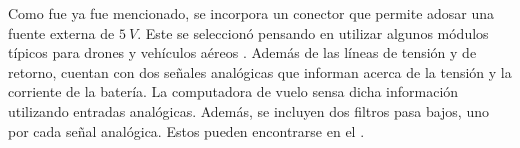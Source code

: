 



Como fue ya fue mencionado, se incorpora un conector que permite adosar una fuente externa de $5 \ V$. Este se seleccionó pensando en utilizar algunos módulos típicos para drones y vehículos aéreos \cite{HolybroPM02PowerModule}. Además de las líneas de tensión y de retorno, cuentan con dos señales analógicas que informan acerca de la tensión y la corriente de la batería. La computadora de vuelo sensa dicha información utilizando entradas analógicas. Además, se incluyen dos filtros pasa bajos, uno por cada señal analógica. Estos pueden encontrarse en el .


